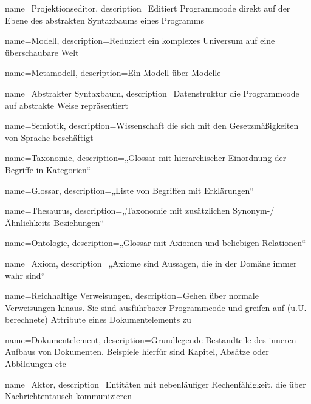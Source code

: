 {
  name=Projektionseditor,
  description={Editiert Programmcode direkt auf der Ebene des
               abstrakten Syntaxbaums eines Programms}
}

{
  name=Modell,
  description={Reduziert ein komplexes Universum auf eine überschaubare Welt}
}

{
  name=Metamodell,
  description={Ein Modell über Modelle}
}

{
  name=Abstrakter Syntaxbaum,
  description={Datenstruktur die Programmcode auf abstrakte Weise repräsentiert}
}

{
  name=Semiotik,
  description={Wissenschaft die sich mit den Gesetzmäßigkeiten von Sprache beschäftigt}
}

{
  name=Taxonomie,
  description={„Glossar mit hierarchischer Einordnung der Begriffe in Kategorien“ \citep[S. 3-4]{Drachenfels}}
}

{
  name=Glossar,
  description={„Liste von Begriffen mit Erklärungen“ \citep[S. 3-4]{Drachenfels}}
}

{
  name=Thesaurus,
  description={„Taxonomie mit zusätzlichen Synonym-/Ähnlichkeits-Beziehungen“ \citep[S. 3-4]{Drachenfels}}
}

{
  name=Ontologie,
  description={„Glossar mit Axiomen und beliebigen Relationen“ \citep[S. 3-4]{Drachenfels}}
}

{
  name=Axiom,
  description={„Axiome sind Aussagen, die in der Domäne immer wahr sind“ \citep[S. 3-4]{Drachenfels}}
}


{
  name=Reichhaltige Verweisungen,
  description={Gehen über normale Verweisungen hinaus. Sie sind ausführbarer Programmcode und greifen auf (u.U. berechnete) Attribute eines Dokumentelements zu}
}

{
  name=Dokumentelement,
  description={Grundlegende Bestandteile des inneren Aufbaus von Dokumenten.
  Beispiele hierfür sind Kapitel, Absätze oder Abbildungen etc}
}

{
  name=Aktor,
  description={Entitäten mit nebenläufiger Rechenfähigkeit, die über Nachrichtentausch kommunizieren}
}

